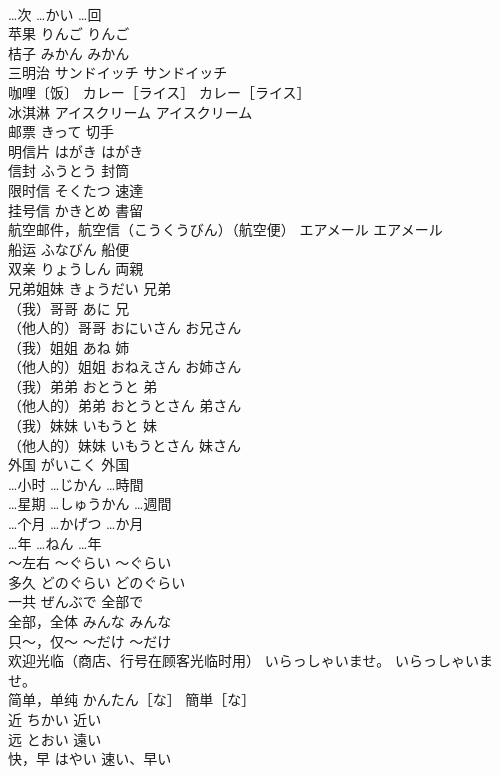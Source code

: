 \documentclass[8pt]{extreport}
\begin{document}
\begin{CJK}{UTF8}{min}
\\	…次	…かい	…回
\\	苹果	りんご	りんご
\\	桔子	みかん	みかん
\\	三明治	サンドイッチ	サンドイッチ
\\	咖哩〔饭〕	カレー［ライス］	カレー［ライス］
\\	冰淇淋	アイスクリーム	アイスクリーム
\\	邮票	きって	切手
\\	明信片	はがき	はがき
\\	信封	ふうとう	封筒
\\	限时信	そくたつ	速達
\\	挂号信	かきとめ	書留
\\	航空邮件，航空信（こうくうびん）（航空便）	エアメール	エアメール
\\	船运	ふなびん	船便
\\	双亲	りょうしん	両親
\\	兄弟姐妹	きょうだい	兄弟
\\	（我）哥哥	あに	兄
\\	（他人的）哥哥	おにいさん	お兄さん
\\	（我）姐姐	あね	姉
\\	（他人的）姐姐	おねえさん	お姉さん
\\	（我）弟弟	おとうと	弟
\\	（他人的）弟弟	おとうとさん	弟さん
\\	（我）妹妹	いもうと	妹
\\	（他人的）妹妹	いもうとさん	妹さん
\\	外国	がいこく	外国
\\	…小时	…じかん	…時間
\\	…星期	…しゅうかん	…週間
\\	…个月	…かげつ	…か月
\\	…年	…ねん	…年
\\	～左右	～ぐらい	～ぐらい
\\	多久	どのぐらい	どのぐらい
\\	一共	ぜんぶで	全部で
\\	全部，全体	みんな	みんな
\\	只～，仅～	～だけ	～だけ
\\	欢迎光临（商店、行号在顾客光临时用）	いらっしゃいませ。	いらっしゃいませ。
\\	简单，单纯	かんたん［な］	簡単［な］
\\	近	ちかい	近い
\\	远	とおい	遠い
\\	快，早	はやい	速い、早い

\end{CJK}
\end{document}
